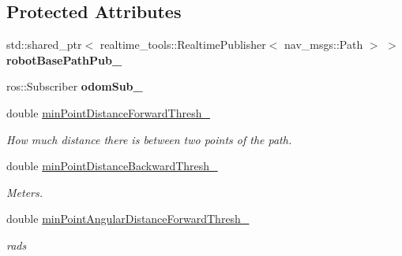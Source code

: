 \subsection*{Protected Attributes}
\begin{DoxyCompactItemize}
\item 
\mbox{\label{classsmacc__odom__tracker_1_1OdomTracker_a32d060919f2630e0695ce016c0563a3f}} 
std\+::shared\+\_\+ptr$<$ realtime\+\_\+tools\+::\+Realtime\+Publisher$<$ nav\+\_\+msgs\+::\+Path $>$ $>$ {\bfseries robot\+Base\+Path\+Pub\+\_\+}
\item 
\mbox{\label{classsmacc__odom__tracker_1_1OdomTracker_a901bd60f4c1d21537a160d034ff504ef}} 
ros\+::\+Subscriber {\bfseries odom\+Sub\+\_\+}
\item 
\mbox{\label{classsmacc__odom__tracker_1_1OdomTracker_a0017d7740d99c2cc8ba946495b96ce41}} 
double \hyperlink{classsmacc__odom__tracker_1_1OdomTracker_a0017d7740d99c2cc8ba946495b96ce41}{min\+Point\+Distance\+Forward\+Thresh\+\_\+}
\begin{DoxyCompactList}\small\item\em How much distance there is between two points of the path. \end{DoxyCompactList}\item 
\mbox{\label{classsmacc__odom__tracker_1_1OdomTracker_a79d94520c5da1852602aaf264377a82f}} 
double \hyperlink{classsmacc__odom__tracker_1_1OdomTracker_a79d94520c5da1852602aaf264377a82f}{min\+Point\+Distance\+Backward\+Thresh\+\_\+}
\begin{DoxyCompactList}\small\item\em Meters. \end{DoxyCompactList}\item 
\mbox{\label{classsmacc__odom__tracker_1_1OdomTracker_a1611f6e11f48e8c2bdf6d16adf35fa2a}} 
double \hyperlink{classsmacc__odom__tracker_1_1OdomTracker_a1611f6e11f48e8c2bdf6d16adf35fa2a}{min\+Point\+Angular\+Distance\+Forward\+Thresh\+\_\+}
\begin{DoxyCompactList}\small\item\em rads \end{DoxyCompactList}\item 

\end{DoxyCompactItemize}
